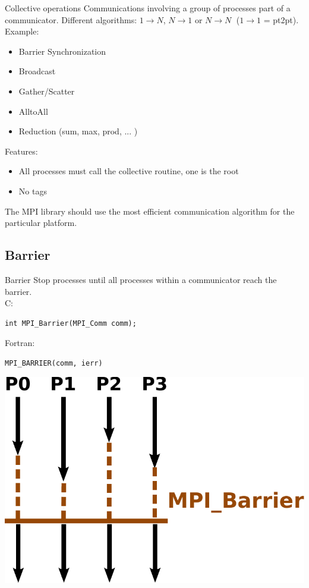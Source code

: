 \documentclass[aspectratio=43]{beamer}
\begin{document}
\begin{frame}{Collective operations}
Communications involving a group of processes part of a communicator.
Different algorithms: $1\rightarrow N$, $N\rightarrow 1$ or $N\rightarrow N\;$ ($1\rightarrow 1$ = pt2pt).\\

Example:
\begin{itemize}
\item Barrier Synchronization
\item Broadcast
\item Gather/Scatter
\item AlltoAll
\item Reduction (sum, max, prod, ... )
\end{itemize}

Features:
\begin{itemize}
    \item All processes must call the collective routine, one is the root
    \item No tags
\end{itemize}

The MPI library should use the most efficient communication algorithm for the particular platform.
\end{frame}


\subsection{Barrier}

\begin{frame}[fragile]{Barrier}
Stop processes until all processes within a communicator reach the barrier.\\
\footnotesize
C:
\vspace{-0.2cm}
\begin{verbatim}
int MPI_Barrier(MPI_Comm comm);
\end{verbatim}
\vspace{-0.2cm}
Fortran:
\vspace{-0.2cm}
\begin{verbatim}
MPI_BARRIER(comm, ierr)
\end{verbatim}
\begin{center}
\includegraphics[scale=0.5]{03.MPI_Coll/barrier.pdf}
\end{center}
\end{frame}
\end{document}
